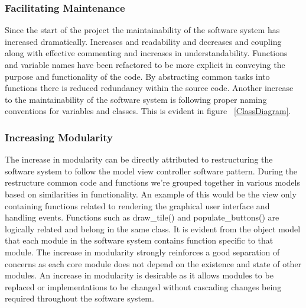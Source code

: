 \documentclass[12pt, a4]{report}
\begin{document}
\subsubsection{Facilitating Maintenance}
Since the start of the project the maintainability of the software system has increased dramatically. Increases and readability and decreases and coupling along with effective commenting and increases in understandability. Functions and variable names have been refactored to be more explicit in conveying the purpose and functionality of the code. By abstracting common tasks into functions there is reduced redundancy within the source code. Another increase to the maintainability of the software system is following proper naming conventions for variables and classes. This is evident in figure ~\ref{ClassDiagram}.

\subsubsection{Increasing Modularity}
The increase in modularity can be directly attributed to restructuring the software system to follow the model view controller software pattern. During the restructure common code and functions we're grouped together in various models based on similarities in functionality. An example of this would be the view only containing functions related to rendering the graphical user interface and handling events. Functions such as draw\_tile() and populate\_buttons() are logically related and belong in the same class. It is evident from the object model that each module in the software system contains function specific to that module. The increase in modularity strongly reinforces a good separation of concerns as each core module does not depend on the existence and state of other modules. An increase in modularity is desirable as it allows modules to be replaced or implementations to be changed without cascading changes being required throughout the software system.

%
%
\end{document}
